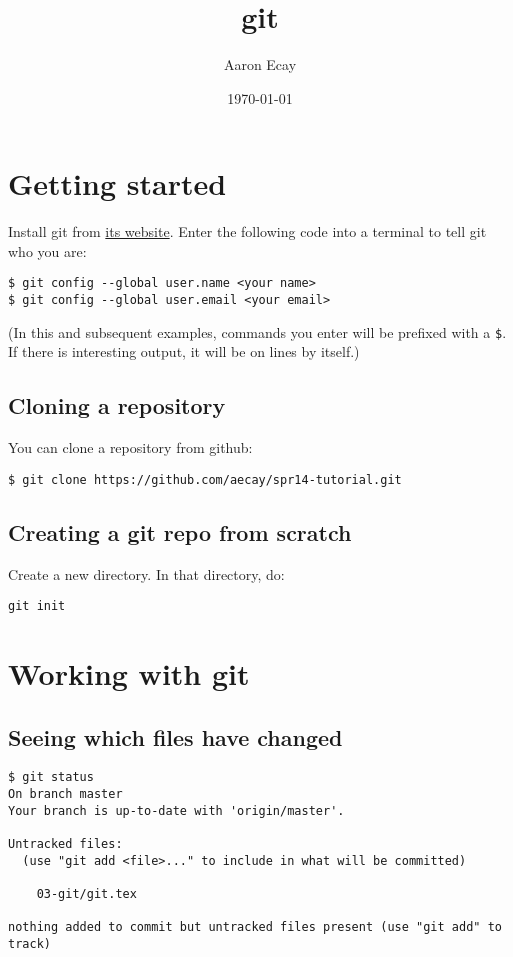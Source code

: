 \documentclass{awe-art}
\author{Aaron Ecay}
\date{\today}
\title{git}
\begin{document}
\maketitle
\tableofcontents

\section{Getting started}
\label{sec-1}

Install git from \href{http://gitscm.com}{its website}.  Enter the following code into a terminal
to tell git who you are:

\begin{verbatim}
$ git config --global user.name <your name>
$ git config --global user.email <your email>
\end{verbatim}

(In this and subsequent examples, commands you enter will be prefixed
with a \verb~$~.  If there is interesting output, it will be on lines by
itself.)

\subsection{Cloning a repository}
\label{sec-1-1}

You can clone a repository from github:
\begin{verbatim}
$ git clone https://github.com/aecay/spr14-tutorial.git
\end{verbatim}
\subsection{Creating a git repo from scratch}
\label{sec-1-2}

Create a new directory.  In that directory, do:
\begin{verbatim}
git init
\end{verbatim}
\section{Working with git}
\label{sec-2}

\subsection{Seeing which files have changed}
\label{sec-2-1}

\begin{verbatim}
$ git status
On branch master
Your branch is up-to-date with 'origin/master'.

Untracked files:
  (use "git add <file>..." to include in what will be committed)

	03-git/git.tex

nothing added to commit but untracked files present (use "git add" to track)
\end{verbatim}
\end{document}
